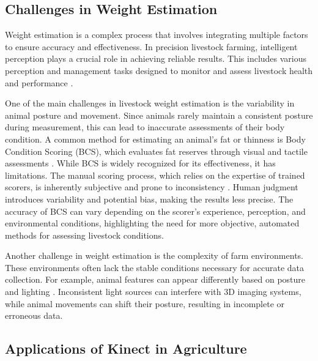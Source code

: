 {\subsection{Challenges in Weight Estimation}

Weight estimation is a complex process that involves integrating multiple factors to ensure accuracy and effectiveness. In precision livestock farming, intelligent perception plays a crucial role in achieving reliable results. This includes various perception and management tasks designed to monitor and assess livestock health and performance \citep{bahlo2019role}.

One of the main challenges in livestock weight estimation is the variability in animal posture and movement. Since animals rarely maintain a consistent posture during measurement, this can lead to inaccurate assessments of their body condition. A common method for estimating an animal's fat or thinness is Body Condition Scoring (BCS), which evaluates fat reserves through visual and tactile assessments \citep{bercovich2013development}. While BCS is widely recognized for its effectiveness, it has limitations. The manual scoring process, which relies on the expertise of trained scorers, is inherently subjective and prone to inconsistency \citep{gjergji2020deep}. Human judgment introduces variability and potential bias, making the results less precise. The accuracy of BCS can vary depending on the scorer’s experience, perception, and environmental conditions, highlighting the need for more objective, automated methods for assessing livestock conditions.

Another challenge in weight estimation is the complexity of farm environments. These environments often lack the stable conditions necessary for accurate data collection. For example, animal features can appear differently based on posture and lighting \citep{ruchay2022live}. Inconsistent light sources can interfere with 3D imaging systems, while animal movements can shift their posture, resulting in incomplete or erroneous data.

\subsection{Applications of Kinect in Agriculture}

}
